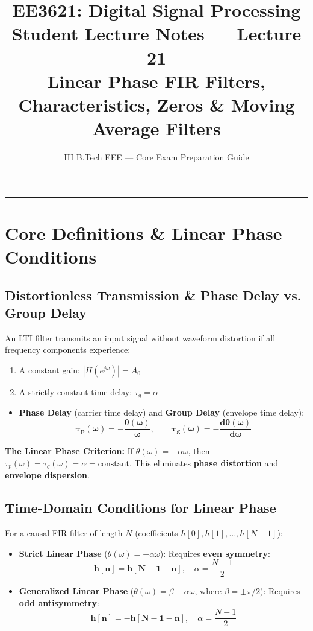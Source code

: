 \documentclass[11pt,a4paper]{article}
\title{\textbf{EE3621: Digital Signal Processing} \\ \Large Student Lecture Notes — Lecture 21 \\ \large Linear Phase FIR Filters, Characteristics, Zeros \& Moving Average Filters}
\author{III B.Tech EEE — Core Exam Preparation Guide}
\date{}
\begin{document}
\maketitle

\noindent\rule{\textwidth}{0.5pt}

\section{Core Definitions \& Linear Phase Conditions}

\subsection{Distortionless Transmission \& Phase Delay vs. Group Delay}
An LTI filter transmits an input signal without waveform distortion if all frequency components experience:
\begin{enumerate}
    \item A constant gain: $|H(e^{j\omega})| = A_0$
    \item A strictly constant time delay: $\tau_g = \alpha$
\end{enumerate}
\begin{itemize}
    \item \textbf{Phase Delay} (carrier time delay) and \textbf{Group Delay} (envelope time delay):
    \begin{equation}
    \mathbf{\tau_p(\omega) = -\frac{\theta(\omega)}{\omega}}, \qquad \mathbf{\tau_g(\omega) = -\frac{d\theta(\omega)}{d\omega}}
    \end{equation}
\end{itemize}
\textbf{The Linear Phase Criterion:} If $\theta(\omega) = -\alpha \omega$, then $\tau_p(\omega) = \tau_g(\omega) = \alpha = \text{constant}$. This eliminates \textbf{phase distortion} and \textbf{envelope dispersion}.

\subsection{Time-Domain Conditions for Linear Phase}
For a causal FIR filter of length $N$ (coefficients $h[0], h[1], \dots, h[N-1]$):
\begin{itemize}
    \item \textbf{Strict Linear Phase} ($\theta(\omega) = -\alpha \omega$): Requires \textbf{even symmetry}:
    \begin{equation}
    \mathbf{h[n] = h[N-1-n]}, \quad \alpha = \frac{N-1}{2}
    \end{equation}
    \item \textbf{Generalized Linear Phase} ($\theta(\omega) = \beta - \alpha \omega$, where $\beta = \pm \pi/2$): Requires \textbf{odd antisymmetry}:
    \begin{equation}
    \mathbf{h[n] = -h[N-1-n]}, \quad \alpha = \frac{N-1}{2}
    \end{equation}
\end{itemize}
\end{document}
